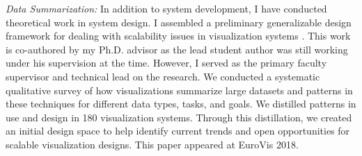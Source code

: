 \documentclass[11pt]{article}
\begin{document}
\emph{Data Summarization:} In addition to system development, I have conducted theoretical work in system design. I assembled a preliminary generalizable design framework for dealing with scalability issues in visualization systems \cite{sarikayadesign}. This work is co-authored by my Ph.D. advisor as the lead student author was still working under his supervision at the time. However, I served as the primary faculty supervisor and technical lead on the research. We conducted a systematic qualitative survey of how visualizations summarize large datasets and patterns in these techniques for different data types, tasks, and goals. We distilled patterns in use and design in 180 visualization systems. Through this distillation, we created an initial design space to help identify current trends and open opportunities for scalable visualization designs. This paper appeared at EuroVis 2018. 

\end{document}
